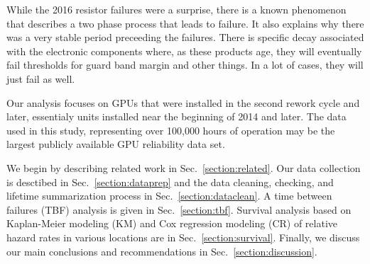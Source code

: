 While the 2016 resistor failures were a surprise, there is a known
phenomenon \cite{referenceneeded} that describes a two phase process
that leads to failure. It also explains why there was a very stable
period preceeding the failures. There is specific decay associated
with the electronic components where, as these products age, they will
eventually fail thresholds for guard band margin and other things. In
a lot of cases, they will just fail as well. 

Our analysis focuses on GPUs that were installed in the second rework
cycle and later, essentialy units installed near the beginning of 2014
and later.  The data used in this study, representing over 100,000
hours of operation may be the largest publicly available GPU
reliability data set.

We begin by describing related work in Sec.~\ref{section:related}. Our
data collection is desctibed in Sec.~\ref{section:dataprep} and the
data cleaning, checking, and lifetime summarization process in
Sec.~\ref{section:dataclean}. A time between failures (TBF) analysis
is given in Sec.~\ref{section:tbf}. Survival analysis based on
Kaplan-Meier modeling (KM) and Cox regression modeling (CR) of
relative hazard rates in various locations are in
Sec.~\ref{section:survival}. Finally, we discuss our main conclusions
and recommendations in Sec.~\ref{section:discussion}.
 


